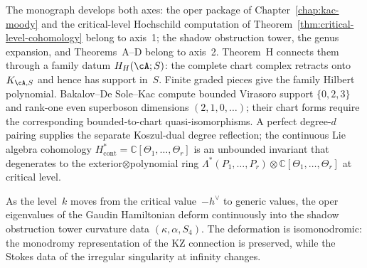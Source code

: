 The monograph develops both axes: the oper package of
Chapter~\ref{chap:kac-moody} and the critical-level
Hochschild computation of
Theorem~\ref{thm:critical-level-cohomology} belong to
axis~1; the shadow obstruction tower, the genus expansion, and
Theorems~A--D belong to axis~2.
Theorem~H connects them through a family datum $H_H(\cA;S)$: the
complete chart complex retracts onto $K_{\cA,S}$ and hence has support
in~$S$.  Finite graded pieces give the family Hilbert polynomial.
Bakalov--De Sole--Kac compute bounded Virasoro support
$\{0,2,3\}$ and rank-one even superboson dimensions
$(2,1,0,\ldots)$; their chart forms require the corresponding
bounded-to-chart quasi-isomorphisms.  A perfect degree-$d$ pairing
supplies the separate Koszul-dual degree reflection;
the continuous Lie algebra cohomology
$H^*_{\mathrm{cont}} = \mathbb{C}[\Theta_1, \ldots, \Theta_r]$
is an unbounded invariant that degenerates to the
exterior$\otimes$polynomial ring
$\Lambda^*(P_1, \ldots, P_r) \otimes
\mathbb{C}[\Theta_1, \ldots, \Theta_r]$ at critical level.

\begin{conjecture}%
\label{conj:isomonodromic-shadow}%
%
%
%
%
As the level~$k$ moves from the critical value~$-h^\vee$ to
generic values, the oper eigenvalues of the Gaudin Hamiltonian
deform continuously into the shadow obstruction tower curvature data
$(\kappa, \alpha, S_4)$. The deformation is isomonodromic:
the monodromy representation of the KZ connection is
preserved, while the Stokes data of the irregular singularity
at infinity changes.
\end{conjecture}


